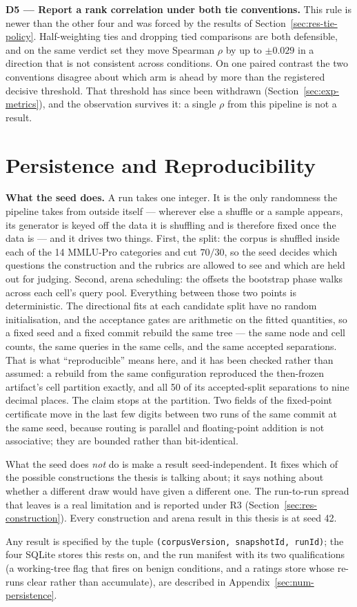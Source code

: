 \textbf{D5 --- Report a rank correlation under both tie conventions.}
This rule is newer than the other four and was forced by the results of
Section~\ref{sec:res-tie-policy}. Half-weighting ties and dropping tied
comparisons are both defensible, and on the same verdict set they move
Spearman $\rho$ by up to $\pm0.029$ in a direction that is not
consistent across conditions. On one paired contrast the two
conventions disagree about which arm is ahead by more than the
registered decisive threshold. That threshold has since been withdrawn
(Section~\ref{sec:exp-metrics}), and the observation survives it: a
single $\rho$ from this pipeline is not a result.

\section{Persistence and Reproducibility}\label{sec:arch-infra}

\textbf{What the seed does.}
A run takes one integer. It is the only randomness the pipeline takes
from outside itself --- wherever else a shuffle or a sample appears,
its generator is keyed off the data it is shuffling and is therefore
fixed once the data is --- and it drives two things.
First, the split: the corpus is shuffled inside each of the 14
MMLU-Pro categories and cut $70/30$, so the seed decides which
questions the construction and the rubrics are allowed to see and which
are held out for judging.
Second, arena scheduling: the offsets the bootstrap phase walks across
each cell's query pool.
Everything between those two points is deterministic. The directional
fits at each candidate split have no random initialisation, and the
acceptance gates are arithmetic on the fitted quantities, so a fixed
seed and a fixed commit rebuild the same tree --- the same node and
cell counts, the same queries in the same cells, and the same accepted
separations. That is what ``reproducible'' means here, and it has been
checked rather than assumed: a rebuild from the same configuration
reproduced the then-frozen artifact's cell partition exactly, and all
50 of its accepted-split separations to nine decimal places.
The claim stops at the partition. Two fields of the fixed-point
certificate move in the last few digits between two runs of the same
commit at the same seed, because routing is parallel and floating-point
addition is not associative; they are bounded rather than
bit-identical.

What the seed does \emph{not} do is make a result seed-independent. It
fixes which of the possible constructions the thesis is talking about;
it says nothing about whether a different draw would have given a
different one. The run-to-run spread that leaves is a real limitation
and is reported under R3 (Section~\ref{sec:res-construction}). Every
construction and arena result in this thesis is at seed 42.

Any result is specified by the tuple
\texttt{(corpusVersion, snapshotId, runId)}; the four SQLite stores
this rests on, and the run manifest with its two qualifications (a
working-tree flag that fires on benign conditions, and a ratings store
whose re-runs clear rather than accumulate), are described in
Appendix~\ref{sec:num-persistence}.
